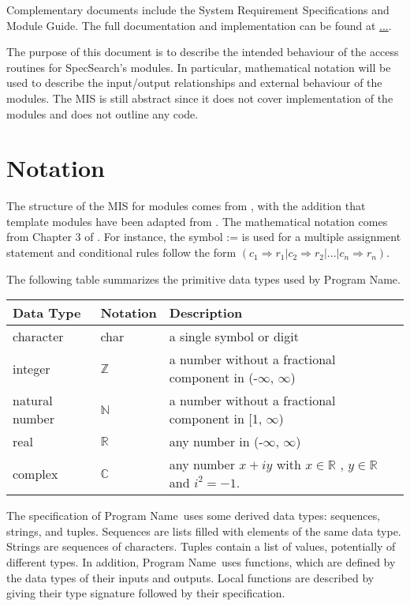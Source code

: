 \documentclass[12pt, titlepage]{article}
\newcommand{\progname}{Program Name}
\begin{document}
Complementary documents include the System Requirement Specifications
and Module Guide.  The full documentation and implementation can be
found at \url{...}.  

The purpose of this document is to describe the intended behaviour of the 
access routines for SpecSearch's modules. In particular, mathematical notation 
will be used to describe the input/output relationships and external behaviour 
of the 
modules. The MIS is still abstract since it does not cover implementation of 
the modules and does not outline any code.  
\section{Notation}

The structure of the MIS for modules comes from \citet{HoffmanAndStrooper1995},
with the addition that template modules have been adapted from
\cite{GhezziEtAl2003}.  The mathematical notation comes from Chapter 3 of
\citet{HoffmanAndStrooper1995}.  For instance, the symbol := is used for a
multiple assignment statement and conditional rules follow the form $(c_1
\Rightarrow r_1 | c_2 \Rightarrow r_2 | ... | c_n \Rightarrow r_n )$.

The following table summarizes the primitive data types used by \progname. 

\begin{center}
\renewcommand{\arraystretch}{1.2}
\noindent 
\begin{tabular}{l l p{7.5cm}} 
\toprule 
\textbf{Data Type} & \textbf{Notation} & \textbf{Description}\\ 
\midrule
character & char & a single symbol or digit\\
integer & $\mathbb{Z}$ & a number without a fractional component in (-$\infty$, $\infty$) \\
natural number & $\mathbb{N}$ & a number without a fractional component in [1, $\infty$) \\
real & $\mathbb{R}$ & any number in (-$\infty$, $\infty$)\\
complex & $\mathbb{C}$ &any number $x + iy$ with $x \in \mathbb{R}$ , $y \in 
\mathbb{R}$ and $i^{2} = -1$. \\
\bottomrule
\end{tabular} 
\end{center}

\noindent
The specification of \progname \ uses some derived data types: sequences, strings, and
tuples. Sequences are lists filled with elements of the same data type. Strings
are sequences of characters. Tuples contain a list of values, potentially of
different types. In addition, \progname \ uses functions, which
are defined by the data types of their inputs and outputs. Local functions are
described by giving their type signature followed by their specification.
\end{document}
